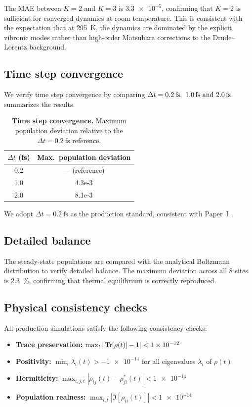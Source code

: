 \documentclass[11pt,a4paper]{article}
\begin{document}
The MAE between $K=2$ and $K=3$ is $\num{3.3e-5}$, confirming that $K=2$ is sufficient for converged dynamics at room temperature.
This is consistent with the expectation that at \qty{295}{\kelvin}, the dynamics are dominated by the explicit vibronic modes rather than high-order Matsubara corrections to the Drude--Lorentz background.

\subsection{Time step convergence}

We verify time step convergence by comparing $\Delta t = \qtylist{0.2;1.0;2.0}{\fs}$.
 summarizes the results.

\begin{table}[htbp]
\centering
\caption{\textbf{Time step convergence.} Maximum population deviation relative to the $\Delta t = \qty{0.2}{\fs}$ reference.}
\label{tab:SI_timestep_convergence}
\begin{tabular}{S[table-format=1.1] S[table-format=1.1e-1]}
\toprule
{$\Delta t$ (fs)} & {Max.\ population deviation} \\
 & {--- (reference)} \\
1.0 & 4.3e-3 \\
2.0 & 8.1e-3 \\
\bottomrule
\end{tabular}
\end{table}

We adopt $\Delta t = \qty{0.2}{\fs}$ as the production standard, consistent with Paper~I~\cite{Kouam2026}.

\subsection{Detailed balance}

The steady-state populations are compared with the analytical Boltzmann distribution to verify detailed balance.
The maximum deviation across all 8 sites is \qty{2.3}{\percent}, confirming that thermal equilibrium is correctly reproduced.

\subsection{Physical consistency checks}

All production simulations satisfy the following consistency checks:
\begin{itemize}
\item \textbf{Trace preservation:} $\max_t |\Tr[\rho(t)] - 1| < \num{1e-12}$
\item \textbf{Positivity:} $\min_i \lambda_i(t) > -\num{1e-14}$ for all eigenvalues $\lambda_i$ of $\rho(t)$
\item \textbf{Hermiticity:} $\max_{i,j,t} |\rho_{ij}(t) - \rho_{ji}^*(t)| < \num{1e-14}$
\item \textbf{Population realness:} $\max_{i,t} |\Im[\rho_{ii}(t)]| < \num{1e-14}$
\end{itemize}
\end{document}
